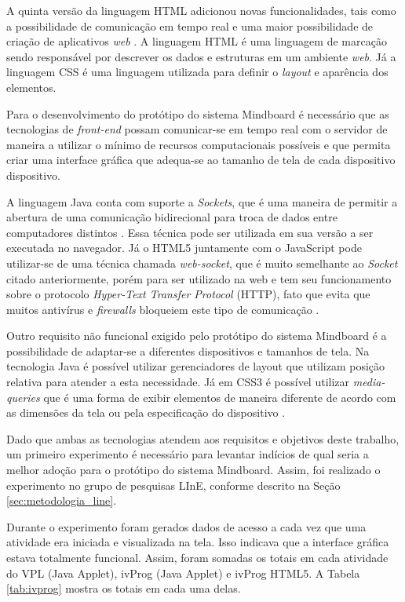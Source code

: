 A quinta versão da linguagem HTML adicionou novas funcionalidades, tais como a possibilidade de comunicação em tempo real e uma maior possibilidade de criação de aplicativos \emph{web} \cite{html5_intro}. A linguagem HTML é uma linguagem de marcação sendo responsável por descrever os dados e estruturas em um ambiente \emph{web}. Já a linguagem CSS é uma linguagem utilizada para definir o \emph{layout} e aparência dos elementos.

Para o desenvolvimento do protótipo do sistema Mindboard é necessário que as tecnologias de \emph{front-end} possam comunicar-se em tempo real com o servidor de maneira a utilizar o mínimo de recursos computacionais possíveis e que permita criar uma interface gráfica que adequa-se ao tamanho de tela de cada dispositivo dispositivo.

A linguagem Java conta com suporte a \emph{Sockets}, que é uma maneira de permitir a abertura de uma comunicação bidirecional para troca de dados entre computadores distintos \cite{sockets}. Essa técnica pode ser utilizada em sua versão a ser executada no navegador. Já o HTML5 juntamente com o JavaScript pode utilizar-se de uma técnica chamada \emph{web-socket}, que é muito semelhante ao \emph{Socket} citado anteriormente, porém para ser utilizado na web e tem seu funcionamento sobre o protocolo \emph{Hyper-Text Transfer Protocol} (HTTP), fato que evita que muitos antivírus e \emph{firewalls} bloqueiem este tipo de comunicação \cite{websockets}.

Outro requisito não funcional exigido pelo protótipo do sistema Mindboard é a possibilidade de adaptar-se a diferentes dispositivos e tamanhos de tela. Na tecnologia Java é possível utilizar gerenciadores de layout que utilizam posição relativa para atender a esta necessidade. Já em CSS3 é possível utilizar \emph{media-queries} que é uma forma de exibir elementos de maneira diferente de acordo com as dimensões da tela ou pela especificação do dispositivo \cite{css3_media_query}.

Dado que ambas as tecnologias atendem aos requisitos e objetivos deste trabalho, um primeiro experimento é necessário para levantar indícios de qual seria a melhor adoção para o protótipo do sistema Mindboard. Assim, foi realizado o experimento no grupo de pesquisas LInE, conforme descrito na Seção \ref{sec:metodologia_line}.

Durante o experimento foram gerados dados de acesso a cada vez que uma atividade era iniciada e visualizada na tela. Isso indicava que a interface gráfica estava totalmente funcional. Assim, foram somadas os totais em cada atividade do VPL (Java Applet), ivProg (Java Applet) e ivProg HTML5. A Tabela \ref{tab:ivprog} mostra os totais em cada uma delas.

